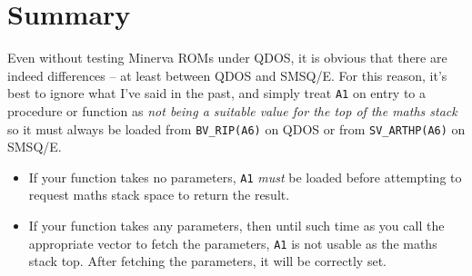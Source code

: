 \section{Summary}

Even without testing Minerva ROMs under QDOS, it is obvious that there
are indeed differences -- at least between QDOS and SMSQ/E. For this
reason, it's best to ignore what I've said in the past, and simply
treat \texttt{A1} on entry to a procedure or function as \emph{not
being a suitable value for the top of the maths stack} so it must
always be loaded from \texttt{BV\_RIP(A6)} on QDOS or from \texttt{SV\_ARTHP(A6)}
on SMSQ/E.
\begin{itemize}
\item If your function takes no parameters, \texttt{A1} \emph{must} be loaded
before attempting to request maths stack space to return the result.
\item If your function takes any parameters, then until such time as you
call the appropriate vector to fetch the parameters, \texttt{A1} is
not usable as the maths stack top. After fetching the parameters,
it will be correctly set.
\end{itemize}

